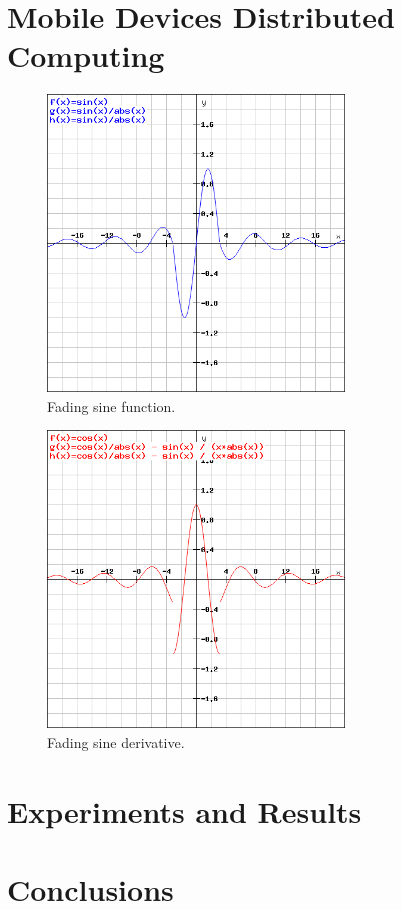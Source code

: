 \documentclass{llncs}
\begin{document}
\section{Mobile Devices Distributed Computing}
%
\begin{figure}
	\centering
	\includegraphics[width=7.88cm,height=7.88cm]{fig01.png}
	\caption{Fading sine function.}
	\label{fig:Graph}
\end{figure}
%
\begin{figure}
	\centering
	\includegraphics[width=7.88cm,height=7.88cm]{fig02.png}
	\caption{Fading sine derivative.}
	\label{fig:Graph}
\end{figure}
\FloatBarrier
%
\section{Experiments and Results}
%
%
\section{Conclusions}
%
%
\end{document}
